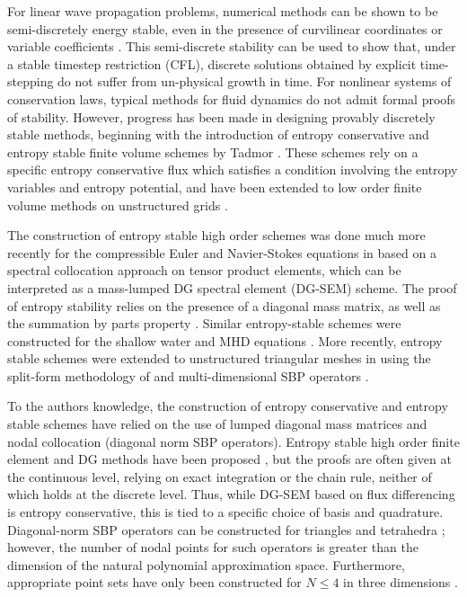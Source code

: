 \documentclass[preprint,10pt]{article}
\theoremstyle{definition}
\theoremstyle{lemma}
\theoremstyle{theorem}
\theoremstyle{assumption}
\begin{document}
For linear wave propagation problems, numerical methods can be shown to be semi-discretely energy stable, even in the presence of curvilinear coordinates or variable coefficients \cite{warburton2013low, chan2016weight1, chan2016weight2, chan2017weight}.  This semi-discrete stability can be used to show that, under a stable timestep restriction (CFL), discrete solutions obtained by explicit time-stepping do not suffer from un-physical growth in time.  For nonlinear systems of conservation laws, typical methods for fluid dynamics do not admit formal proofs of stability.  However, progress has been made in designing provably discretely stable methods, beginning with the introduction of entropy conservative and entropy stable finite volume schemes by Tadmor \cite{tadmor1987numerical, tadmor2003entropy}.   These schemes rely on a specific entropy conservative flux which satisfies a condition involving the entropy variables and entropy potential, and have been extended to low order finite volume methods on unstructured grids \cite{ray2016entropy}.  

The construction of entropy stable high order schemes was done much more recently for the compressible Euler and Navier-Stokes equations in \cite{fisher2013high, carpenter2014entropy} based on a spectral collocation approach on tensor product elements, which can be interpreted as a mass-lumped DG spectral element (DG-SEM) scheme.  The proof of entropy stability relies on the presence of a diagonal mass matrix, as well as the summation by parts property \cite{gassner2013skew}.  Similar entropy-stable schemes were constructed for the shallow water and MHD equations \cite{derigs2016novel, gassner2016well, wintermeyer2017entropy}.  More recently, entropy stable schemes were extended to unstructured triangular meshes in \cite{chen2017entropy} using the split-form methodology of \cite{gassner2016split} and multi-dimensional SBP operators \cite{hicken2016multidimensional}.  

To the authors knowledge, the construction of entropy conservative and entropy stable schemes have relied on the use of lumped diagonal mass matrices and nodal collocation (diagonal norm SBP operators).  Entropy stable high order finite element and DG methods have been proposed \cite{hughes1986new}, but the proofs are often given at the continuous level, relying on exact integration or the chain rule, neither of which holds at the discrete level.  Thus, while DG-SEM based on flux differencing is entropy conservative, this is tied to a specific choice of basis and quadrature.  Diagonal-norm SBP operators can be constructed for triangles and tetrahedra \cite{chin1999higher, cohen2001higher, hicken2016multidimensional, chen2017entropy}; however, the number of nodal points for such operators is greater than the dimension of the natural polynomial approximation space.  Furthermore, appropriate point sets have only been constructed for $N \leq 4$ in three dimensions \cite{zhebel2014comparison}.  
\end{document}
